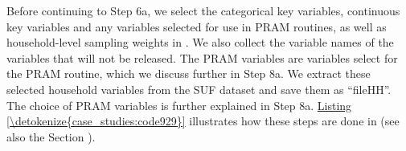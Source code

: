 \documentclass[letterpaper,10pt,english]{sphinxmanual}
\begin{document}
Before continuing to Step 6a, we select the categorical key variables,
continuous key variables and any variables selected for use in PRAM
routines, as well as household-level sampling weights in . We also
collect the variable names of the variables that will not be released.
The PRAM variables are variables select for the PRAM routine, which we
discuss further in Step 8a. We extract these selected household
variables from the SUF dataset and save them as “fileHH”. The choice of
PRAM variables is further explained in Step 8a. \hyperref[\detokenize{case_studies:code929}]{Listing \ref{\detokenize{case_studies:code929}}} illustrates
how these steps are done in  (see also the Section
).

\def\sphinxLiteralBlockLabel{\label{\detokenize{case_studies:code929}}}
%
\end{document}

